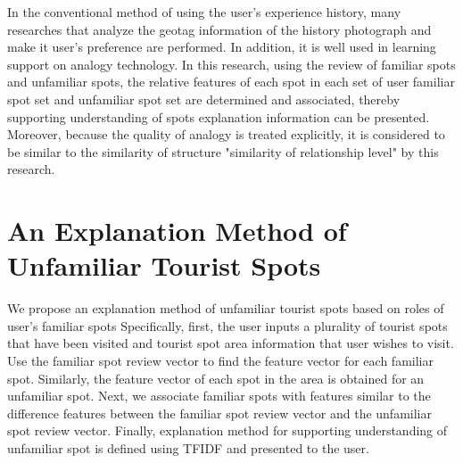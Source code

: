 \documentclass[journal]{IAENGtran}
\begin{document}
In the conventional method of using the user's experience history, many researches that analyze the geotag information of the history photograph and make it user's preference are performed.
In addition, it is well used in learning support on analogy technology.
In this research, using the review of familiar spots and unfamiliar spots, the relative features of each spot in each set of user familiar spot set and unfamiliar spot set are determined and associated, thereby supporting understanding of spots explanation information can be presented.
Moreover, because the quality of analogy is treated explicitly, it is considered to be similar to the similarity of structure "similarity of relationship level" by this research.



\section{An Explanation Method of Unfamiliar Tourist Spots}
\label{sec:An Explainaton Method of Unfamiliar Tourist Spots}
We propose an explanation method of unfamiliar tourist spots based on roles of user's familiar spots
Specifically, first, the user inputs a plurality of tourist spots that have been visited and tourist spot area information that user wishes to visit.
Use the familiar spot review vector to find the feature vector for each familiar spot.
Similarly, the feature vector of each spot in the area is obtained for an unfamiliar spot.
Next, we associate familiar spots with features similar to the difference features between the familiar spot review vector and the unfamiliar spot review vector.
Finally, explanation method for supporting understanding of unfamiliar spot is defined using TFIDF and presented to the user.
\end{document}
